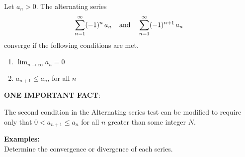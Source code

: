 \documentclass[addpoints, 12pt]{exam}
\begin{document}
\vspace{.07in}

\begin{tcolorbox}[title= THE ALTERNATING SERIES TEST,colframe=black,sharp corners,colback=white,colbacktitle=white,coltitle=black]

    Let $a_n>0$. The alternating series
    \[\sum_{n=1}^\infty(-1)^n\, a_n\hspace{.15in}\text{and}\hspace{.15in}\sum_{n=1}^\infty(-1)^{n+1}\,a_n\]
    converge if the following conditions are met.\\
    \begin{enumerate}
        \item $\displaystyle\lim_{n\to\infty}a_n=0$
        \item $\displaystyle a_{n+1}\le a_n$, for all $n$
    \end{enumerate}

\end{tcolorbox}
\vspace{.1in}
\noindent\textbf{ONE IMPORTANT FACT}:
\begin{questions}
    \question The second condition in the Alternating series test can be modified to require only that $0<a_{n+1}\le a_n$ for all $n$ greater than some integer $N$.
\end{questions}
\vspace{.1in}

\noindent\textbf{Examples:}\\
Determine the convergence or divergence of each series.

\newpage
\end{document}
